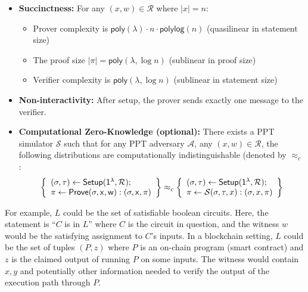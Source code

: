 \begin{definition}
\begin{itemize}
    \item \textbf{Succinctness:} For any $(x, w) \in \mathcal{R}$ where $|x| = n$:
    \begin{itemize}
     \item Prover complexity is $\mathsf{poly}(\lambda) \cdot n \cdot \mathsf{polylog}(n)$ (quasilinear in statement size)
        \item The proof size $|\pi| = \mathsf{poly}(\lambda, \log n)$ (sublinear in proof size) 
        \item Verifier complexity is $\mathsf{poly}(\lambda, \log n)$ (sublinear in statement size)
    \end{itemize}
    
    \item \textbf{Non-interactivity:} After setup, the prover sends exactly one message to the verifier.
    \item \textbf{Computational Zero-Knowledge (optional):} There exists a PPT simulator $\mathcal{S}$ such that for any PPT adversary $\mathcal{A}$, any $(x, w) \in \mathcal{R}$, the following distributions are computationally indistinguishable (denoted by $\approx_c$:
    \begin{align*}
    \left\{ \begin{array}{l}
    (\sigma, \tau) \leftarrow \sf{Setup}(1^{\lambda}, \mathcal{R}); \\
    \pi \leftarrow \sf{Prove}(\sigma, x, w) : (\sigma, x, \pi)
    \end{array} \right\} \approx_c
    \left\{ \begin{array}{l}
    (\sigma, \tau) \leftarrow \sf{Setup}(1^{\lambda}, \mathcal{R}); \\
    \pi \leftarrow \mathcal{S}(\sigma, \tau, x) : (\sigma, x, \pi)
    \end{array} \right\}
\end{align*}
\end{itemize}
\end{definition}

\noindent For example, $L$ could be the set of satisfiable boolean circuits. Here, the statement is ``$C$ is in $L$'' where $C$ is the circuit in question, and the witness $w$ would be the satisfying assignment to $C$'s inputs. In a blockchain setting, $L$ could be the set of tuples $(P, z)$ where $P$ is an on-chain program (smart contract) and $z$ is the claimed output of running $P$ on some inputs. The witness would contain $x, y$ and potentially other information needed to verify the output of the execution path through $P$.\\

